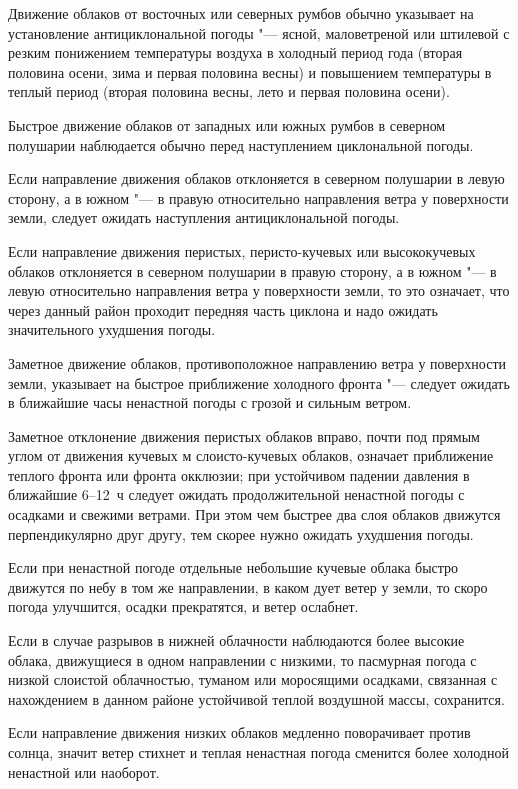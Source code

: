  Движение облаков от восточных или северных румбов обычно
указывает на установление антициклональной погоды "--- ясной,
маловетреной или штилевой с резким понижением температуры воздуха в
холодный период года (вторая половина осени, зима и первая половина
весны) и повышением температуры в теплый период (вторая половина
весны, лето и первая половина осени).

 Быстрое движение облаков от западных или южных румбов в
северном полушарии наблюдается обычно перед наступлением циклональной
погоды.

 Если направление движения облаков отклоняется в северном
полушарии в левую сторону, а в южном "--- в правую относительно направления
ветра у поверхности земли, следует ожидать наступления
антициклональной погоды.

 Если направление движения перистых, перисто-кучевых или
высококучевых облаков отклоняется в северном полушарии в правую
сторону, а в южном "--- в левую относительно направления ветра у
поверхности земли, то это означает, что через данный район проходит
передняя часть циклона и надо ожидать значительного ухудшения погоды.

 Заметное движение облаков, противоположное направлению ветра у
поверхности земли, указывает на быстрое приближение холодного
фронта "--- следует ожидать в ближайшие часы ненастной погоды с грозой и
сильным ветром.

 Заметное отклонение движения перистых облаков вправо, почти под
прямым углом от движения кучевых м слоисто-кучевых облаков, означает
приближение теплого фронта или фронта окклюзии; при устойчивом падении
давления в ближайшие 6--12~ч следует ожидать продолжительной ненастной
погоды с осадками и свежими ветрами. При этом чем быстрее два слоя
облаков движутся перпендикулярно друг другу, тем скорее нужно ожидать
ухудшения погоды.

 Если при ненастной погоде отдельные небольшие кучевые облака
быстро движутся по небу в том же направлении, в каком дует ветер у
земли, то скоро погода улучшится, осадки прекратятся, и ветер
ослабнет.

 Если в случае разрывов в нижней облачности наблюдаются более
высокие облака, движущиеся в одном направлении с низкими, то пасмурная
погода с низкой слоистой облачностью, туманом или моросящими осадками,
связанная с нахождением в данном районе устойчивой теплой воздушной
массы, сохранится.

 Если направление движения низких облаков медленно поворачивает
против солнца, значит ветер стихнет и теплая ненастная погода сменится
более холодной ненастной или наоборот.

